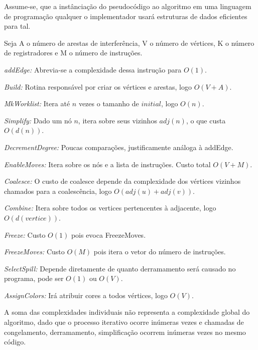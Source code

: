 Assume-se, que a instânciação do pseudocódigo ao algoritmo em uma linguagem de programação qualquer o implementador usará estruturas de dados eficientes para tal.

Seja A o número de arestas de interferência, V o número de vértices, K o número de registradores e M o número de instruções.

\textit{addEdge:} Abrevia-se a complexidade dessa instrução para $O(1)$.

\textit{Build:} Rotina responsável por criar os vértices e arestas, logo $O(V + A)$.

\textit{MkWorklist: } Itera até $n$ vezes o tamanho de $initial$, logo $O(n)$.

\textit{Simplify: } Dado um nó $n$, itera sobre seus vizinhos $adj(n)$, o que custa $O(d(n))$.

\textit{DecrementDegree: } Poucas comparações, justificamente análoga à addEdge.

\textit{EnableMoves: } Itera sobre os nós e a lista de instruções. Custo total $O(V + M)$.

\textit{Coalesce: } O custo de coalesce depende da complexidade dos vértices vizinhos chamados para a coalescência, logo $O(adj(u) + adj(v))$.

\textit{Combine: } Itera sobre todos os vertices pertencentes à adjacente, logo $O(d(vertice))$.

\textit{Freeze: } Custo $O(1)$ pois evoca FreezeMoves.

\textit{FreezeMoves: } Custo $O(M)$ pois itera o vetor do número de instruções.

\textit{SelectSpill: } Depende diretamente de quanto derramamento será causado no programa, pode ser $O(1)$ ou $O(V)$.

\textit{AssignColors: } Irá atribuir cores a todos vértices, logo $O(V)$.


A soma das complexidades individuais não representa a complexidade global do algoritmo, dado que o processo iterativo ocorre inúmeras vezes e chamadas de congelamento, derramamento, simplificação ocorrem inúmeras vezes no mesmo código.
